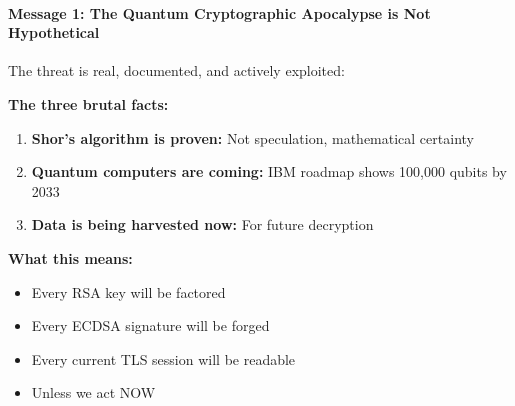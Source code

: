 \documentclass[11pt,a4paper]{article}
\begin{document}
\paragraph{Message 1: The Quantum Cryptographic Apocalypse is Not Hypothetical}

The threat is real, documented, and actively exploited:

\begin{figure}[h]
\centering
{}
\end{figure}

\textbf{The three brutal facts:}
\begin{enumerate}
    \item \textbf{Shor's algorithm is proven:} Not speculation, mathematical certainty
    \item \textbf{Quantum computers are coming:} IBM roadmap shows 100,000 qubits by 2033
    \item \textbf{Data is being harvested now:} For future decryption
\end{enumerate}

\textbf{What this means:}
\begin{itemize}
    \item Every RSA key will be factored
    \item Every ECDSA signature will be forged
    \item Every current TLS session will be readable
    \item Unless we act NOW
\end{itemize}
\end{document}
